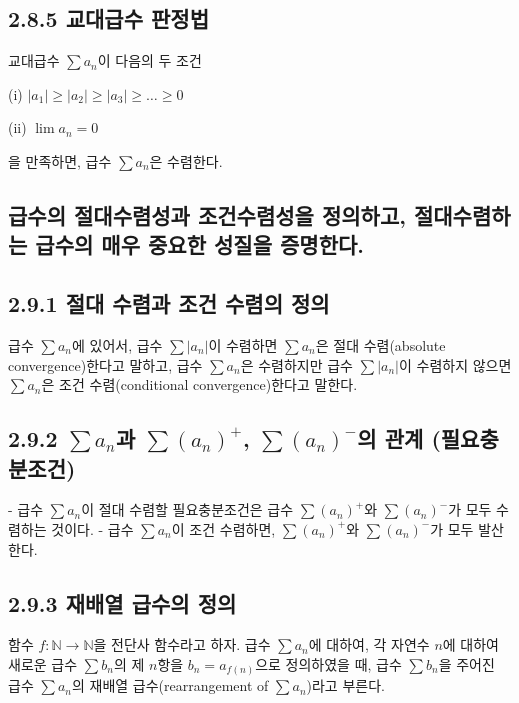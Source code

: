 \documentclass{article}
\begin{document}
\subsection*{\textmd{2.8.5 교대급수 판정법}}

교대급수 \( \sum a_n \)이 다음의 두 조건

(i) \( \left| a_1 \right| \geq \left| a_2 \right| \geq \left| a_3 \right| \geq \dots \geq 0 \)

(ii) \( \lim a_n = 0 \)

을 만족하면, 급수 \( \sum a_n \)은 수렴한다.



\subsection{\fontsize{11.5}{13}\selectfont 
급수의 절대수렴성과 조건수렴성을 정의하고, 절대수렴하는 급수의 매우 중요한 성질을 증명한다.} 

\subsection*{\textmd{2.9.1 절대 수렴과 조건 수렴의 정의}}
급수 \( \sum a_n \)에 있어서, 급수 \( \sum |a_n| \)이 수렴하면 \( \sum a_n \)은 절대 수렴(absolute convergence)한다고 말하고,
급수 \( \sum a_n \)은 수렴하지만 급수 \( \sum |a_n| \)이 수렴하지 않으면 \( \sum a_n \)은 조건 수렴(conditional convergence)한다고 말한다.

\subsection*{\textmd{2.9.2 \( \sum a_n \)과 \( \sum (a_n)^+ \), \( \sum (a_n)^- \)의 관계 (필요충분조건)}}
- 급수 \( \sum a_n \)이 절대 수렴할 필요충분조건은 급수 \( \sum (a_n)^+ \)와 \( \sum (a_n)^- \)가 모두 수렴하는 것이다.
- 급수 \( \sum a_n \)이 조건 수렴하면, \( \sum (a_n)^+ \)와 \( \sum (a_n)^- \)가 모두 발산한다.

\subsection*{\textmd{2.9.3 재배열 급수의 정의}}
함수 \( f: \mathbb{N} \to \mathbb{N} \)을 전단사 함수라고 하자. 급수 \( \sum a_n \)에 대하여, 각 자연수 \( n \)에 대하여 새로운 급수 \( \sum b_n \)의 제 \( n \)항을
\( b_n = a_{f(n)} \)으로 정의하였을 때, 급수 \( \sum b_n \)을 주어진 급수 \( \sum a_n \)의 재배열 급수(rearrangement of \( \sum a_n \))라고 부른다.
\end{document}
